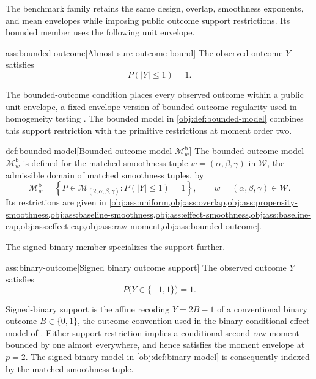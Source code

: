 \documentclass[11pt]{article}
\begin{document}
The benchmark family retains the same design, overlap, smoothness exponents, and mean envelopes while imposing public outcome support restrictions. Its bounded member uses the following unit envelope.

\begin{assumptionv}{ass:bounded-outcome}[Almost sure outcome bound]
The observed outcome \(Y\) satisfies
\[
P(|Y|\le 1)=1.
\]
\end{assumptionv}

The bounded-outcome condition places every observed outcome within a public unit envelope, a fixed-envelope version of bounded-outcome regularity used in homogeneity testing \citep{LapentaStrittmatterVergara2026Omnibus}. The bounded model  in \cref{obj:def:bounded-model} combines this support restriction with the primitive restrictions at moment order two.

\begin{definitionv}{def:bounded-model}[Bounded-outcome model $\mathcal M^{\mathrm b}_w$]
The bounded-outcome model \(\mathcal M^{\mathrm b}_w\) is defined for the matched smoothness tuple \(w=(\alpha,\beta,\gamma)\) in \(\mathcal W\), the admissible domain of matched smoothness tuples, by
\[
\mathcal M^{\mathrm b}_w
=
\left\{
P\in\mathcal M_{(2,\alpha,\beta,\gamma)}:
P(|Y|\le 1)=1
\right\},
\qquad
w=(\alpha,\beta,\gamma)\in\mathcal W.
\]
Its restrictions are given in \cref{obj:ass:uniform,obj:ass:overlap,obj:ass:propensity-smoothness,obj:ass:baseline-smoothness,obj:ass:effect-smoothness,obj:ass:baseline-cap,obj:ass:effect-cap,obj:ass:raw-moment,obj:ass:bounded-outcome}.
\end{definitionv}

The signed-binary member specializes the support further.

\begin{assumptionv}{ass:binary-outcome}[Signed binary outcome support]
The observed outcome \(Y\) satisfies
\[
P\bigl(Y\in\{-1,1\}\bigr)=1.
\]
\end{assumptionv}

Signed-binary support is the affine recoding \(Y=2B-1\) of a conventional binary outcome \(B\in\{0,1\}\), the outcome convention used in the binary conditional-effect model of \citet[Section 2]{KennedyBalakrishnanRobinsWasserman2024MinimaxCATE}. Either support restriction implies a conditional second raw moment bounded by one almost everywhere, and hence satisfies the moment envelope at \(p=2\). The signed-binary model  in \cref{obj:def:binary-model} is consequently indexed by the matched smoothness tuple.
\end{document}

